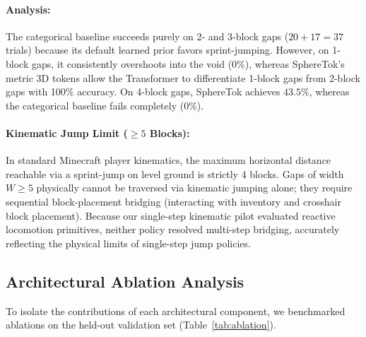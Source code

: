 \documentclass[10pt,twocolumn,letterpaper]{article}
\begin{document}
\paragraph{Analysis:}
The categorical baseline succeeds purely on 2- and 3-block gaps ($20 + 17 = 37$ trials) because its default learned prior favors sprint-jumping. However, on 1-block gaps, it consistently overshoots into the void ($0\%$), whereas SphereTok's metric 3D tokens allow the Transformer to differentiate 1-block gaps from 2-block gaps with 100\% accuracy. On 4-block gaps, SphereTok achieves $43.5\%$, whereas the categorical baseline fails completely ($0\%$).

\paragraph{Kinematic Jump Limit ($\ge 5$ Blocks):} In standard Minecraft player kinematics, the maximum horizontal distance reachable via a sprint-jump on level ground is strictly 4 blocks. Gaps of width $W \geq 5$ physically cannot be traversed via kinematic jumping alone; they require sequential block-placement bridging (interacting with inventory and crosshair block placement). Because our single-step kinematic pilot evaluated reactive locomotion primitives, neither policy resolved multi-step bridging, accurately reflecting the physical limits of single-step jump policies.

\subsection{Architectural Ablation Analysis}
To isolate the contributions of each architectural component, we benchmarked ablations on the held-out validation set (Table~\ref{tab:ablation}).

\begin{table}[t]
\centering
\caption{Architectural Ablation Analysis on Held-Out Terrain.}
\label{tab:ablation}
\end{table}
\end{document}

